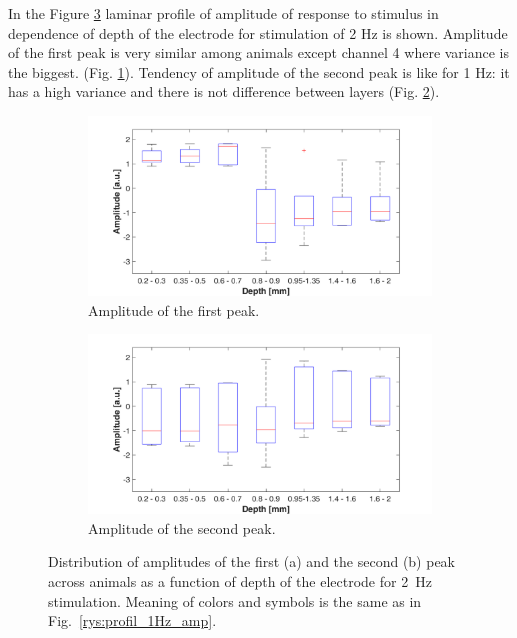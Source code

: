 \documentclass{pracalicmgr}
\begin{document}
    In the Figure \ref{rys:profil_2Hz_amp} laminar profile of amplitude of response to stimulus in dependence of depth of the electrode for stimulation of 2 Hz is shown. Amplitude of the first peak is very similar among animals except channel 4 where variance is the biggest. (Fig. \ref{rys:profil_2Hz_amp1}). Tendency of amplitude of the second peak is like for 1 Hz: it has a high variance and there is not difference between layers (Fig. \ref{rys:profil_2Hz_amp2}).
  
 	\begin{figure}[H]
 	\begin{subfigure}{.5\textwidth}
 		\centering
 		\includegraphics[width=1.\linewidth]{profile_2Hz_amp.png}
 		\caption{Amplitude of the first peak.}
 		\label{rys:profil_2Hz_amp1}
 	\end{subfigure}%
 	\begin{subfigure}{.5\textwidth}
 		\centering
 		\includegraphics[width=1.\linewidth]{profile_2Hz_amp2.png}
 		\caption{Amplitude of the second peak.}
 		\label{rys:profil_2Hz_amp2}
 	\end{subfigure}
 	
 	\caption{Distribution of amplitudes of the first (a) and the second (b) peak across animals as a function of depth of the electrode for 2~Hz stimulation. Meaning of colors and symbols is the same as in Fig.~\ref{rys:profil_1Hz_amp}.}
 	\label{rys:profil_2Hz_amp}
 \end{figure}
\end{document}
